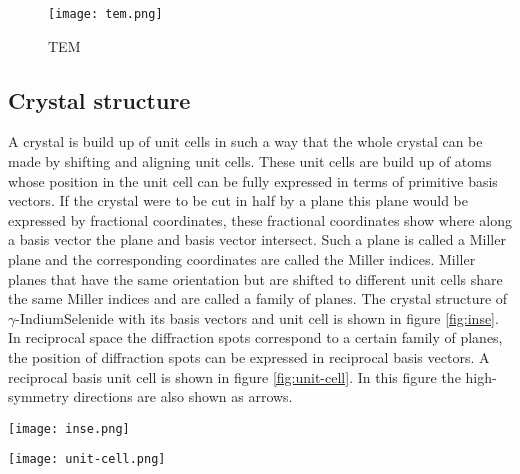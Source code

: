

\begin{figure}
	\centering
	\texttt{[image: tem.png]}
	\caption{TEM}
	\label{fig:tem}
\end{figure}

\subsection{Crystal structure}
A crystal is build up of unit cells in such a way that the whole crystal can be made by shifting and aligning unit cells. These unit cells are build up of atoms whose position in the unit cell can be fully expressed in terms of primitive basis vectors. If the crystal were to be cut in half by a plane this plane would be expressed by fractional coordinates, these fractional coordinates show where along a basis vector the plane and basis vector intersect. Such a plane is called a Miller plane and the corresponding coordinates are called the Miller indices. Miller planes that have the same orientation but are shifted to different unit cells share the same Miller indices and are called a family of planes. The crystal structure of $\gamma$-IndiumSelenide with its basis vectors and unit cell is shown in figure \ref{fig:inse}.
In reciprocal space the diffraction spots correspond to a certain family of planes, the position of diffraction spots can be expressed in reciprocal basis vectors. A reciprocal basis unit cell is shown in figure \ref{fig:unit-cell}. In this figure the high-symmetry directions are also shown as arrows.

\begin{minipage}{0.5\textwidth}
	\centering
	\texttt{[image: inse.png]}
	\label{fig:inse}
\end{minipage}%
\begin{minipage}{0.5\textwidth}
	\centering
	\texttt{[image: unit-cell.png]}
	\label{fig:unit-cell}
\end{minipage}

